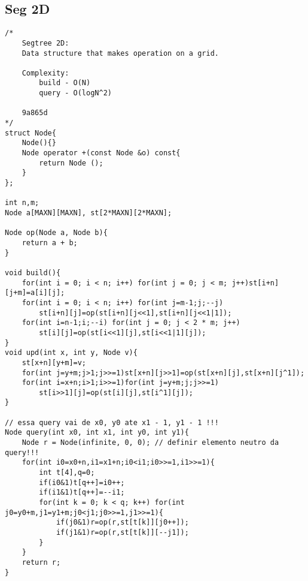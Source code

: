 \documentclass{article}
\begin{document}
\subsection{Seg 2D}
\begin{verbatim}
/*  
    Segtree 2D:
    Data structure that makes operation on a grid.

    Complexity:
        build - O(N)
        query - O(logN^2)
    
    9a865d
*/
struct Node{
    Node(){}
    Node operator +(const Node &o) const{
        return Node ();
    }
};

int n,m;
Node a[MAXN][MAXN], st[2*MAXN][2*MAXN];

Node op(Node a, Node b){
    return a + b;
}

void build(){
    for(int i = 0; i < n; i++) for(int j = 0; j < m; j++)st[i+n][j+m]=a[i][j];
    for(int i = 0; i < n; i++) for(int j=m-1;j;--j)
        st[i+n][j]=op(st[i+n][j<<1],st[i+n][j<<1|1]);
    for(int i=n-1;i;--i) for(int j = 0; j < 2 * m; j++)
        st[i][j]=op(st[i<<1][j],st[i<<1|1][j]);
}
void upd(int x, int y, Node v){
    st[x+n][y+m]=v;
    for(int j=y+m;j>1;j>>=1)st[x+n][j>>1]=op(st[x+n][j],st[x+n][j^1]);
    for(int i=x+n;i>1;i>>=1)for(int j=y+m;j;j>>=1)
        st[i>>1][j]=op(st[i][j],st[i^1][j]);
}

// essa query vai de x0, y0 ate x1 - 1, y1 - 1 !!!
Node query(int x0, int x1, int y0, int y1){
    Node r = Node(infinite, 0, 0); // definir elemento neutro da query!!!
    for(int i0=x0+n,i1=x1+n;i0<i1;i0>>=1,i1>>=1){
        int t[4],q=0;
        if(i0&1)t[q++]=i0++;
        if(i1&1)t[q++]=--i1;
        for(int k = 0; k < q; k++) for(int j0=y0+m,j1=y1+m;j0<j1;j0>>=1,j1>>=1){
            if(j0&1)r=op(r,st[t[k]][j0++]);
            if(j1&1)r=op(r,st[t[k]][--j1]);
        }
    }
    return r;
}
\end{verbatim}
\end{document}
